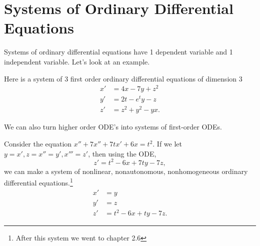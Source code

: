 \newpage
\section{Systems of Ordinary Differential Equations}
Systems of ordinary differential equations have 1 dependent variable and 1 independent variable. Let's look at an example.

\begin{eg}
  Here is a system of 3 first order ordinary differential equations of dimension 3 
  \begin{align*}
    x'&=4x-7y+z^2\\
    y'&=2t-e^{t}y-z\\
    z'&=z^2+y^2-yx
  .\end{align*}
\end{eg}

We can also turn higher order ODE's into systems of first-order ODEs.
\begin{eg}
  Consider the equation $x''+7x''+7tx'+6x=t^2$. If we let $y=x',z=x''=y',x'''=z'$, then using the ODE,
  \[
  z'=t^2-6x+7ty-7z
  ,\]
  we can make a system of nonlinear, nonautonomous, nonhomogeneous ordinary differential equations.\footnote{After this system we went to chapter 2.6}
  \begin{align*}
    x'&=y\\
    y'&=z\\
    z'&=t^2-6x+ty-7z
  .\end{align*}
\end{eg}
